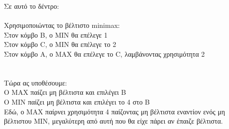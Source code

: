 \documentclass{article}
\begin{document}
Σε αυτό το δέντρο: \\ \\
Χρησιμοποιώντας το βέλτιστο \textlatin{minimax}: \\
Στον κόμβο \textlatin{B}, ο \textlatin{MIN} θα επέλεγε 1 \\
Στον κόμβο \textlatin{C}, ο \textlatin{MIN} θα επέλεγε το 2 \\
Στον κόμβο \textlatin{A}, ο \textlatin{MAX} θα επέλεγε το \textlatin{C}, λαμβάνοντας χρησιμότητα 2 \\
\\ \\
Τώρα ας υποθέσουμε: \\
Ο \textlatin{MAX} παίζει μη βέλτιστα και επιλέγει B \\
Ο \textlatin{MIN} παίζει μη βέλτιστα και επιλέγει το 4 στο B \\
Εδώ, ο \textlatin{MAX} παίρνει χρησιμότητα 4 παίζοντας μη βέλτιστα εναντίον ενός μη βέλτιστου \textlatin{MIN}, μεγαλύτερη από αυτή που θα είχε πάρει αν έπαιζε βέλτιστα. \\
\end{document}

